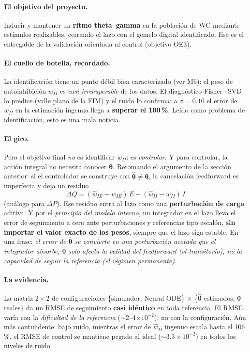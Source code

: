 \documentclass[11pt,a4paper]{article}
\newcommand{\thetavec}{\bm{\theta}}
\begin{document}
\paragraph{El objetivo del proyecto.} Inducir y mantener un \textbf{ritmo theta--gamma} en la población de WC mediante estímulos realizables, cerrando el lazo con el gemelo digital identificado. Ese es el entregable de la validación orientada al control (objetivo OE3).

\paragraph{El cuello de botella, recordado.} La identificación tiene un punto débil bien caracterizado (ver M6): el peso de autoinhibición $w_{II}$ es \emph{casi irrecuperable} de los datos. El diagnóstico Fisher+SVD lo predice (valle plano de la FIM) y el ruido lo confirma: a $\sigma=0.10$ el error de $w_{II}$ en la estimación ingenua llega a \textbf{superar el 100\,\%}. Leído como problema de identificación, esto es una mala noticia.

\paragraph{El giro.} Pero el objetivo final \emph{no} es identificar $w_{II}$: es \emph{controlar}. Y para controlar, la acción integral no necesita conocer $\thetavec$. Retomando el argumento de la sección anterior: si el controlador se construye con $\hat{\thetavec} \neq \thetavec$, la cancelación feedforward es imperfecta y deja un residuo
$$\Delta Q = (\hat w_{IE}-w_{IE})\,E - (\hat w_{II}-w_{II})\,I$$
(análogo para $\Delta P$). Ese residuo entra al lazo como una \textbf{perturbación de carga} aditiva. Y por el \emph{principio del modelo interno}, un integrador en el lazo lleva el error de seguimiento a cero ante perturbaciones y referencias tipo escalón, \textbf{sin importar el valor exacto de los pesos}, siempre que el lazo siga estable. En una frase: \emph{el error de $\hat{\thetavec}$ se convierte en una perturbación acotada que el integrador absorbe; $\hat{\thetavec}$ solo afecta la calidad del feedforward (el transitorio), no la capacidad de seguir la referencia (el régimen permanente).}

\paragraph{La evidencia.} La matriz $2\times 2$ de configuraciones \{simulador, Neural ODE\} $\times$ \{$\hat{\thetavec}$ estimados, $\thetavec$ reales\} da un RMSE de seguimiento \textbf{casi idéntico} en toda referencia. El RMSE varía con la \emph{dificultad de la referencia} ($\sim$2--4$\times 10^{-2}$), no con la configuración. Aún más contundente: bajo ruido, mientras el error de $\hat w_{II}$ ingenuo escala hasta el 106\,\%, el RMSE de control se mantiene pegado al ideal ($\sim 3.3\times 10^{-2}$) en todos los niveles de ruido.
\end{document}
